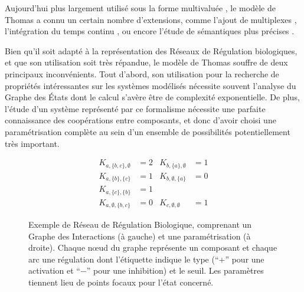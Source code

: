 Aujourd'hui plus largement utilisé sous la forme multivaluée \cite{richard-comet-bernot-08}, le modèle de Thomas a connu un certain nombre d'extensions,
comme l'ajout de multiplexes \cite{bernot-comet-khalis-08},
l'intégration du temps continu \cite{Ahmad08},
ou encore l'étude de sémantiques plus précises \cite{BernotSemBRN}.

Bien qu'il soit adapté à la représentation des Réseaux de Régulation biologiques, et que son utilisation soit très répandue, le modèle de Thomas souffre de deux principaux inconvénients.
Tout d'abord, son utilisation pour la recherche de propriétés intéressantes sur les systèmes modélisés nécessite souvent l'analyse du Graphe des États dont le calcul s'avère être de complexité exponentielle.
De plus, l'étude d'un système représenté par ce formalisme nécessite une parfaite connaissance des coopérations entre composants, et donc d'avoir choisi une paramétrisation complète au sein d'un ensemble de possibilités potentiellement très important.

\begin{figure}[p]
\begin{minipage}{0.4\linewidth}
\centering
{}
\end{minipage}
\begin{minipage}{0.6\linewidth}
\centering
\begin{align*}
K_{a,\{b,c\},\emptyset} &= 2 & K_{b,\{a\},\emptyset} &= 1 \\
K_{a,\{b\},\{c\}} &= 1 & K_{b,\emptyset,\{a\}} &= 0 \\
K_{a,\{c\},\{b\}} &= 1 &&\\
K_{a,\emptyset,\{b,c\}} &= 0 & K_{c,\emptyset,\emptyset} &= 1
\end{align*}
\end{minipage}
\caption{\label{fig:exRRB}
Exemple de Réseau de Régulation Biologique, comprenant un Graphe des Interactions (à gauche) et une paramétrisation (à droite).
Chaque nœud du graphe représente un composant et chaque arc une régulation
dont l'étiquette indique le type (“$+$” pour une activation et “$-$” pour une inhibition) et le seuil.
Les paramètres tiennent lieu de points focaux pour l'état concerné.
}
\end{figure}



